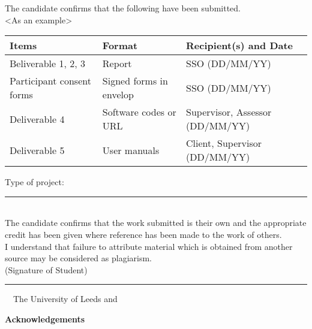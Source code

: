 \frontcover

\clearpage
\noindent The candidate confirms that the following have been submitted.\\
<As an example>
\begin{table}[ht!]
\begin{tabular}{|p{}|p{}|p{}|}
\hline
Items & Format & Recipient(s) and Date \\
\hline
Beliverable 1, 2, 3 & Report & SSO (DD/MM/YY) \\
\hline
Participant consent forms & Signed forms in envelop & SSO (DD/MM/YY) \\
\hline
Deliverable 4 & Software codes or URL & Supervisor, Assessor (DD/MM/YY) \\
\hline
Deliverable 5 & User manuals & Client, Supervisor (DD/MM/YY) \\
\hline
\end{tabular}
\end{table}

\noindent Type of project: \rule{100mm}{1pt}
\vspace{\fill}\\
\noindent The candidate confirms that the work submitted is their own and the appropriate credit has been given where reference has been made to the work of others.
\vspace{\fill}\\
\noindent I understand that failure to attribute material which is obtained from another source may be considered as plagiarism.
\vspace{\fill}\\
\flushright(Signature of Student) \rule{50mm}{1pt}
\flushleft
\vspace{\fill}
\textcopyright~\session~The University of Leeds and~\fullname

\begin{dissertationsummary}

\end{dissertationsummary}

\clearpage
\centering\textbf{Acknowledgements}
\flushleft


\tableofcontents

\clearpage
\listoffigures

